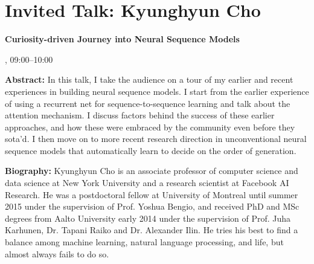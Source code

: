 \section{Invited Talk: Kyunghyun Cho}

\begin{center}
\begin{Large}
    {\bfseries\Large Curiosity-driven Journey into Neural Sequence Models} \vspace{1em}\par
\end{Large}


\daydateyear, 09:00--10:00 \vspace{1em}\\
\vspace{1em}\par
\end{center}

\noindent
{\bfseries Abstract:} In this talk, I take the audience on a tour of my earlier and recent experiences in building neural sequence models. I start from the earlier experience of using a recurrent net for sequence-to-sequence learning and talk about the attention mechanism. I discuss factors behind the success of these earlier approaches, and how these were embraced by the community even before they sota'd. I then move on to more recent research direction in unconventional neural sequence models that automatically learn to decide on the order of generation.
\vspace{3em}\par 

\vfill
\noindent

{\bfseries Biography:} Kyunghyun Cho is an associate professor of computer science and data science at New York University and a research scientist at Facebook AI Research. He was a postdoctoral fellow at University of Montreal until summer 2015 under the supervision of Prof. Yoshua Bengio, and received PhD and MSc degrees from Aalto University early 2014 under the supervision of Prof. Juha Karhunen, Dr. Tapani Raiko and Dr. Alexander Ilin. He tries his best to find a balance among machine learning, natural language processing, and life, but almost always fails to do so.

\newpage
